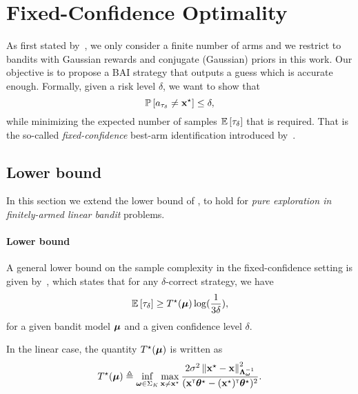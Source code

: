 \section{Fixed-Confidence Optimality}\label{sec:lgc.lower_bound}

As first stated by~\cite{soare2014linear}, we only consider a finite number of arms and we restrict to bandits  with Gaussian rewards and conjugate (Gaussian) priors in this work. Our objective is to propose a BAI strategy that outputs a guess which is accurate enough. Formally, given a risk level $\delta$, we want to show that
\[
  \mathbb{P}\left[a_{\tau_\delta}\neq {\bf x}^\star\right] \leq \delta,
\]
while minimizing the expected number of samples $\mathbb{E}\left[\tau_\delta\right]$ that is required. That is the so-called \emph{fixed-confidence} best-arm identification introduced by~\cite{even-dar2003confidence}.

\subsection{Lower bound}

In this section we extend the lower bound of \citet{garivier2016tracknstop}, to hold for \emph{pure exploration in finitely-armed linear bandit} problems.

\paragraph{Lower bound} A general lower bound on the sample complexity in the fixed-confidence setting is given by~\cite{garivier2016tracknstop}, which states that for any $\delta$-correct strategy, we have
\[
    \mathbb{E}\left[\tau_\delta\right] \geq T^\star({\boldsymbol \mu})\log(\frac{1}{3\delta}),
\]
for a given bandit model ${\boldsymbol \mu}$ and a given confidence level $\delta$. 

\begin{proposition}
In the linear case, the quantity $T^\star({\boldsymbol \mu})$ is written as
\[
  T^\star({\boldsymbol \mu}) \triangleq \inf_{{\boldsymbol \omega}\in\Sigma_K}\max_{{\bf x}\neq {\bf x}^\star} \frac{2\sigma^2\left\lVert{\bf x}^\star - {\bf x}\right\rVert^2_{{\boldsymbol \Lambda}_{{\boldsymbol \omega}}^{-1}}}{({\bf x}^\mathsf{\scriptscriptstyle T}{\boldsymbol \theta}^\star-({\bf x}^\star)^\mathsf{\scriptscriptstyle T}{\boldsymbol \theta}^\star)^2}.
\]
\end{proposition}

